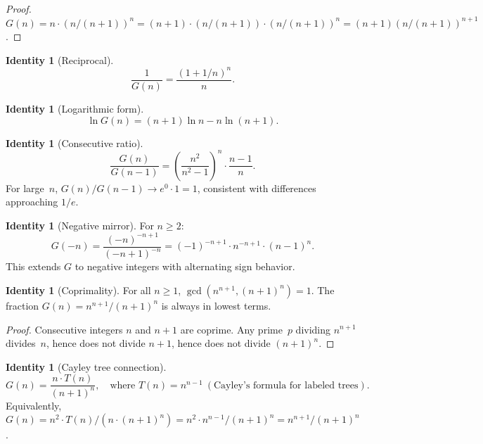 \documentclass[11pt,a4paper]{article}
\theoremstyle{definition}
\newtheorem{identity}[theorem]{Identity}
\theoremstyle{remark}
\begin{document}
\begin{proof}
$G(n) = n\cdot(n/(n+1))^{n} = (n+1)\cdot(n/(n+1))\cdot(n/(n+1))^{n} = (n+1)(n/(n+1))^{n+1}$.
\end{proof}

\begin{identity}[Reciprocal]\label{id:recip}
\begin{equation}\label{eq:recip}
  \frac{1}{G(n)} = \frac{(1+1/n)^{n}}{n}.
\end{equation}
\end{identity}

\begin{identity}[Logarithmic form]\label{id:log}
\begin{equation}\label{eq:log}
  \ln G(n) = (n+1)\ln n - n\ln(n+1).
\end{equation}
\end{identity}

\begin{identity}[Consecutive ratio]\label{id:consec}
\begin{equation}\label{eq:consec}
  \frac{G(n)}{G(n-1)} = \left(\frac{n^{2}}{n^{2}-1}\right)^{n}\cdot\frac{n-1}{n}.
\end{equation}
For large~$n$, $G(n)/G(n-1) \to e^{0}\cdot 1 = 1$, consistent with differences approaching $1/e$.
\end{identity}

\begin{identity}[Negative mirror]\label{id:negmirror}
For $n \ge 2$:
\begin{equation}\label{eq:negmirror}
  G(-n) = \frac{(-n)^{-n+1}}{(-n+1)^{-n}} = (-1)^{-n+1}\cdot n^{-n+1}\cdot(n-1)^{n}.
\end{equation}
This extends $G$ to negative integers with alternating sign behavior.
\end{identity}

\begin{identity}[Coprimality]\label{id:coprime}
For all $n \ge 1$, $\gcd(n^{n+1},(n+1)^{n})=1$. The fraction $G(n)=n^{n+1}/(n+1)^{n}$ is always in lowest terms.
\end{identity}

\begin{proof}
Consecutive integers $n$ and $n+1$ are coprime. Any prime~$p$ dividing $n^{n+1}$ divides~$n$, hence does not divide $n+1$, hence does not divide $(n+1)^{n}$.
\end{proof}

\begin{identity}[Cayley tree connection]\label{id:cayley}
\begin{equation}\label{eq:cayley}
  G(n) = \frac{n\cdot T(n)}{(n+1)^{n}},\quad\text{where } T(n) = n^{n-1}\ (\text{Cayley's formula for labeled trees}).
\end{equation}
Equivalently, $G(n) = n^{2}\cdot T(n)/(n\cdot(n+1)^{n}) = n^{2}\cdot n^{n-1}/(n+1)^{n} = n^{n+1}/(n+1)^{n}$.
\end{identity}
\end{document}
